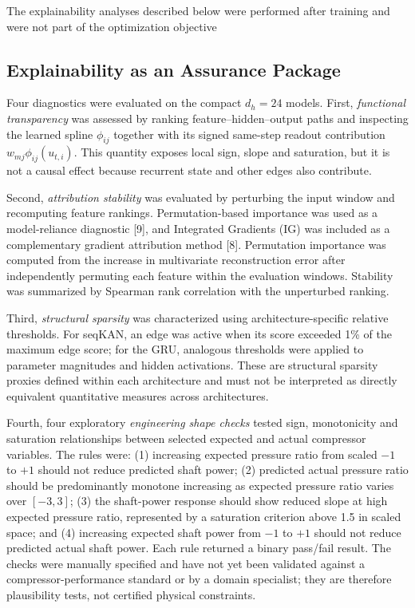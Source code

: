 \documentclass[conference]{IEEEtran}
\begin{document}
The explainability analyses described below were performed after training and were not part of the optimization objective

\subsection{Explainability as an Assurance Package}
Four diagnostics were evaluated on the compact $d_h=24$ models. First, \emph{functional transparency} was assessed by ranking feature--hidden--output paths and inspecting the learned spline $\phi_{ij}$ together with its
signed same-step readout contribution
$w_{mj}\phi_{ij}(u_{t,i})$. This quantity exposes local sign, slope and saturation, but it is not a causal effect because recurrent state and other edges also contribute.

Second, \emph{attribution stability} 
was evaluated by perturbing the input window and recomputing feature rankings. Permutation-based importance was used as a model-reliance diagnostic [9], and Integrated Gradients (IG) was included as a complementary gradient attribution method [8]. Permutation importance was computed from the increase in multivariate reconstruction error after independently permuting each feature within the evaluation windows. Stability was summarized by Spearman rank correlation with the unperturbed ranking.

Third, \emph{structural sparsity} was characterized using architecture-specific relative thresholds. For seqKAN, an edge was active when its score exceeded 1\% of the maximum edge score; for the GRU, analogous thresholds were applied to parameter magnitudes and hidden activations. These are structural sparsity proxies defined within each architecture and must not be interpreted as directly equivalent quantitative measures across architectures.

Fourth, four exploratory \emph{engineering shape checks} tested sign, monotonicity and saturation relationships between selected expected and actual compressor variables. The rules were: (1) increasing expected pressure ratio from scaled $-1$ to $+1$ should not reduce predicted shaft power; (2) predicted actual pressure ratio should be predominantly monotone increasing as expected pressure ratio varies over $[-3,3]$; (3) the shaft-power response should show reduced slope at high expected pressure ratio, represented by a saturation criterion above 1.5 in scaled space; and (4) increasing expected shaft power from $-1$ to $+1$ should not reduce predicted actual shaft power. Each rule returned a binary pass/fail result. The checks were manually specified and have not yet been validated against a compressor-performance standard or by a domain specialist; they are therefore plausibility tests, not certified physical constraints.
\end{document}
